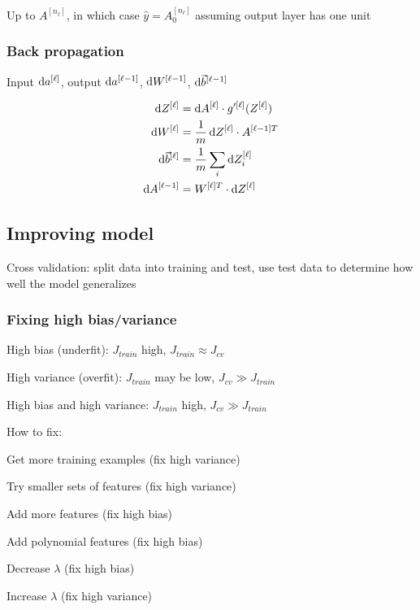 \documentclass[12pt]{article}
\begin{document}
Up to $A^{[n_{\ell}]}$, in which case $\hat{y} = A^{[n_{\ell}]}_0$ assuming output layer has one unit

\subsubsection{Back propagation}

Input $\mathop{}\!\mathrm{d} a^{[\ell]}$, output $\mathop{}\!\mathrm{d} a^{[\ell-1]}$, $\mathop{}\!\mathrm{d} W^{[\ell-1]}$, $\mathop{}\!\mathrm{d} \vec{b}^{[\ell-1]}$

\begin{align*}
    \dif Z^{[\ell]} &= \dif A^{[\ell]} \cdot g'^{[\ell]}(Z^{[\ell]})\\
    \dif W^{[\ell]} &= \frac{1}{m} \dif Z^{[\ell]} \cdot A^{[\ell-1] T}\\
    \dif \vec{b}^{[\ell]} &= \frac{1}{m} \sum_i \dif Z^{[\ell]}_i\\
    \dif A^{[\ell-1]} &= W^{[\ell] T} \cdot \dif Z^{[\ell]}
\end{align*}

\subsection{Improving model}

Cross validation: split data into training and test, use test data to determine how well the model generalizes

\subsubsection{Fixing high bias/variance}

High bias (underfit): $J_{train}$ high, $J_{train} \approx J_{cv}$

High variance (overfit): $J_{train}$ may be low, $J_{cv} \gg J_{train}$

High bias and high variance: $J_{train}$ high, $J_{cv} \gg J_{train}$

How to fix:

\begin{myenumerate}
\item Get more training examples (fix high variance)
\item Try smaller sets of features (fix high variance)
\item Add more features (fix high bias)
\item Add polynomial features (fix high bias)
\item Decrease $\lambda$ (fix high bias)
\item Increase $\lambda$ (fix high variance)
\end{myenumerate}
\end{document}
